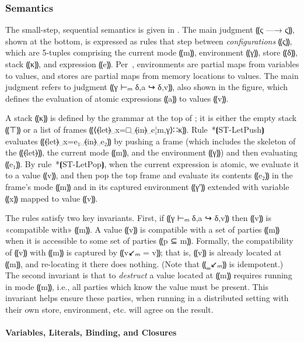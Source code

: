 
\subsubsection{Semantics}
\label{subsubsec:mpc-design-seq-sem}

The small-step, sequential semantics is given in . The
main judgment ⸨ς —→ ς⸩, shown at the bottom, is expressed as rules that step
between \emph{configurations} ⸨ς⸩, which are 5-tuples comprising the current
mode ⸨m⸩, environment ⸨γ⸩, store ⸨δ⸩, stack ⸨κ⸩, and expression ⸨e⸩.
Per~, environments are partial maps from variables to
values, and stores are partial maps from memory locations to values. The main
judgment refers to judgment ⸨γ ⊢ₘ δ,a ↪ δ,v⸩, also shown in the figure, which
defines the evaluation of atomic expressions ⸨a⸩ to values ⸨v⸩.

A stack ⸨κ⸩ is defined by the grammar at the top of
; it is either the empty stack ⸨⊤⸩ or a
list of frames ⸨⟨⦑let⦒␣x=□␣⦑in⦒␣e¦m,γ⟩∷κ⸩. Rule~*⦗ST-LetPush⦘ evaluates
⸨⦑let⦒␣x=e₁␣⦑in⦒␣e₂⸩ by pushing a frame (which includes the skeleton of the
⸨⦑let⦒⸩, the current mode ⸨m⸩, and the environment ⸨γ⸩) and then evaluating
⸨e₁⸩. By rule~*⦗ST-LetPop⦘, when the current expression is atomic, we
evaluate it to a value ⸨v⸩, and then pop the top frame and evaluate its
contents ⸨e₂⸩ in the frame's mode ⸨m⸩ and in its captured environment ⸨γ′⸩
extended with variable ⸨x⸩ mapped to value ⸨v⸩.

The rules satisfy two key invariants. First, if ⸨γ ⊢ₘ δ,a ↪ δ,v⸩ then ⸨v⸩ is «compatible
with» ⸨m⸩. A value ⸨v⸩ is compatible with a set of parties ⸨m⸩ when it is
accessible to some set of parties ⸨p ⊆ m⸩. Formally, the compatibility of ⸨v⸩
with ⸨m⸩ is captured by ⸨v↙ₘ = v⸩; that is, ⸨v⸩ is already located at ⸨m⸩, and
re-locating it there does nothing. (Note that ⸨‗↙ₘ⸩ is idempotent.)
The second invariant is that to \emph{destruct} a value located at ⸨m⸩
requires running in mode ⸨m⸩, i.e., all parties which know the value must be
present. This invariant helps ensure these parties, when running in a
distributed setting with their own store, environment, etc. will agree on the
result.

\paragraph*{Variables, Literals, Binding, and Closures}

